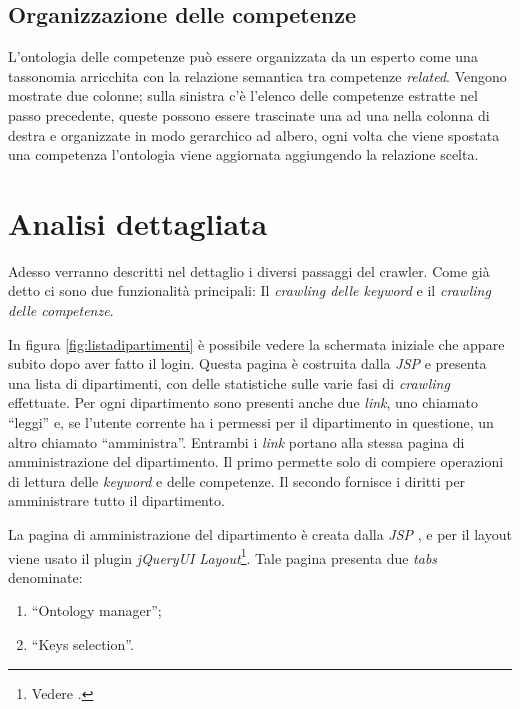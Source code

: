 \documentclass[tesi.tex]{subfiles}
\begin{document}
\subsection{Organizzazione delle competenze}
L'ontologia delle competenze pu\`o essere organizzata da un esperto
come una tassonomia arricchita con la relazione semantica tra
competenze \emph{related}. Vengono mostrate due
colonne; sulla sinistra c'\`e l'elenco delle competenze estratte nel
passo precedente, queste possono essere trascinate una ad una nella
colonna di destra e organizzate in modo gerarchico ad albero, ogni
volta che viene spostata una competenza l'ontologia viene aggiornata
aggiungendo la relazione scelta.

\section{Analisi dettagliata}
Adesso verranno descritti nel dettaglio i diversi passaggi del
crawler. Come gi\`a detto ci sono due funzionalit\`a principali:
Il \emph{crawling delle keyword} e il \emph{crawling delle
  competenze}. 

In figura \ref{fig:listadipartimenti}
\`e possibile vedere la schermata iniziale che appare subito dopo aver
fatto il login. Questa pagina \`e costruita dalla \emph{JSP}
 e presenta una lista di dipartimenti, con delle
statistiche sulle varie fasi di \emph{crawling} effettuate. Per ogni
dipartimento sono presenti anche due \emph{link}, uno chiamato
``leggi'' e, se l'utente corrente ha i permessi per il
dipartimento in questione, un altro chiamato ``amministra''. Entrambi
i \emph{link} portano alla stessa pagina di amministrazione del
dipartimento. Il primo permette solo di compiere operazioni di lettura
delle \emph{keyword} e delle competenze. Il secondo fornisce i diritti
per amministrare tutto il dipartimento.

La pagina di amministrazione del dipartimento \`e creata dalla
\emph{JSP} , e per il layout viene usato il plugin
\emph{jQueryUI Layout}\footnote{Vedere \cite{jqueryuilayout}.}. Tale
pagina presenta due \emph{tabs} denominate:
\begin{enumerate}
\item ``Ontology manager'';
\item ``Keys selection''.
\end{enumerate}
\end{document}
